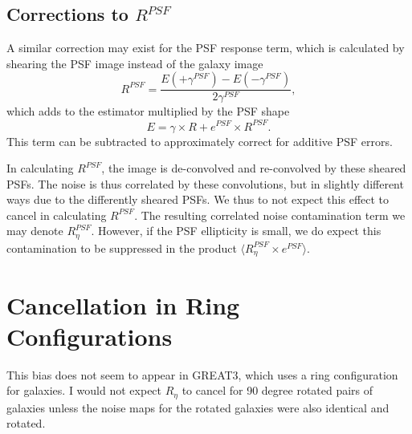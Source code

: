 \documentclass[usegraphicx,usenatbib]{mn2e}
\begin{document}
\subsection{Corrections to $R^{PSF}$}

A similar correction may exist for the PSF response term, which is
calculated by shearing the PSF image instead of the galaxy image
\begin{equation}
    R^{PSF} = \frac{E(+\gamma^{PSF}) - E(-\gamma^{PSF})}{2 \gamma^{PSF}},
\end{equation}
which adds to the estimator multiplied by the PSF shape
\begin{equation}
    E = \gamma \times R + e^{PSF} \times R^{PSF}.
\end{equation}
This term can be subtracted to approximately correct for additive PSF errors.

In calculating $R^{PSF}$, the image is de-convolved and re-convolved by these
sheared PSFs. The noise is thus correlated by these convolutions, but in
slightly different ways due to the differently sheared PSFs.  We thus to not
expect this effect to cancel in calculating $R^{PSF}$. The resulting correlated
noise contamination term we may denote $R^{PSF}_\eta$.  However, if the PSF
ellipticity is small, we do expect this contamination to be suppressed in the
product $\langle R^{PSF}_\eta\times e^{PSF}\rangle$.

\section{Cancellation in Ring Configurations}

This bias does not seem to appear in GREAT3, which uses a ring configuration
for galaxies.  I would not expect $R_\eta$ to cancel for 90 degree rotated
pairs of galaxies unless the noise maps for the rotated galaxies
were also identical and rotated.




\end{document}
